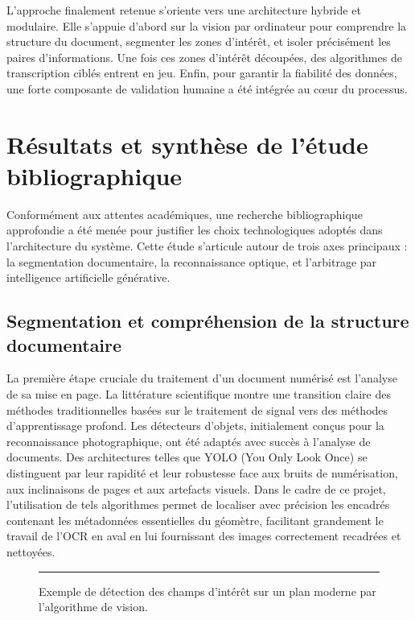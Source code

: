 \documentclass[a4paper,11pt]{article}
\begin{document}
L'approche finalement retenue s'oriente vers une architecture hybride et modulaire. Elle s'appuie d'abord sur la vision par ordinateur pour comprendre la structure du document, segmenter les zones d'intérêt, et isoler précisément les paires d'informations. Une fois ces zones d'intérêt découpées, des algorithmes de transcription ciblés entrent en jeu. Enfin, pour garantir la fiabilité des données, une forte composante de validation humaine a été intégrée au cœur du processus.

\section{Résultats et synthèse de l'étude bibliographique}

Conformément aux attentes académiques, une recherche bibliographique approfondie a été menée pour justifier les choix technologiques adoptés dans l'architecture du système. Cette étude s'articule autour de trois axes principaux : la segmentation documentaire, la reconnaissance optique, et l'arbitrage par intelligence artificielle générative.

\subsection{Segmentation et compréhension de la structure documentaire}
La première étape cruciale du traitement d'un document numérisé est l'analyse de sa mise en page. La littérature scientifique montre une transition claire des méthodes traditionnelles basées sur le traitement de signal vers des méthodes d'apprentissage profond. Les détecteurs d'objets, initialement conçus pour la reconnaissance photographique, ont été adaptés avec succès à l'analyse de documents. Des architectures telles que YOLO (You Only Look Once) se distinguent par leur rapidité et leur robustesse face aux bruits de numérisation, aux inclinaisons de pages et aux artefacts visuels. Dans le cadre de ce projet, l'utilisation de tels algorithmes permet de localiser avec précision les encadrés contenant les métadonnées essentielles du géomètre, facilitant grandement le travail de l'OCR en aval en lui fournissant des images correctement recadrées et nettoyées.

\begin{figure}[htbp]
    \centering
    \textcolor{gray}{\rule{0.8\textwidth}{6cm}}
    \caption{Exemple de détection des champs d'intérêt sur un plan moderne par l'algorithme de vision.}
    \label{fig:segmentation_yolo}
\end{figure}
\end{document}
